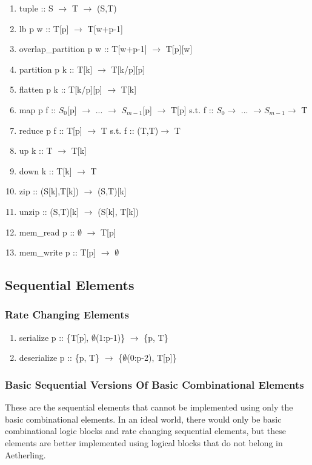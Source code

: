 \documentclass[11pt,fleqn]{article}
\numberwithin{equation}{subsection}
\begin{document}
\begin{enumerate}
    \item tuple :: S $\rightarrow$ T $\rightarrow$ (S,T)
    \item lb p w :: T[p] $\rightarrow$ T[w+p-1]
    \item overlap\_partition p w :: T[w+p-1] $\rightarrow$ T[p][w]
    \item partition p k :: T[k] $\rightarrow$ T[k/p][p]
    \item flatten p k :: T[k/p][p] $\rightarrow$ T[k]
    \item map p f :: $S_0$[p] $\rightarrow$ ... $\rightarrow$ $S_{m-1}$[p] $\rightarrow$ 
        T[p]
        \subitem s.t. f :: $S_0 \rightarrow$ ... $\rightarrow S_{m-1} \rightarrow$ T 
    \item reduce p f :: T[p] $\rightarrow$ T
        \subitem s.t. f :: (T,T)$\rightarrow$ T
    \item up k :: T $\rightarrow$ T[k]
    \item down k :: T[k] $\rightarrow$ T
    \item zip :: (S[k],T[k]) $\rightarrow$ (S,T)[k]
    \item unzip :: (S,T)[k] $\rightarrow$ (S[k], T[k])
    \item mem\_read p :: $\emptyset$ $\rightarrow$ T[p]
    \item mem\_write p :: T[p] $\rightarrow$ $\emptyset$
\end{enumerate}

\subsection{Sequential Elements}

\subsubsection{Rate Changing Elements}

\begin{enumerate}
    \item serialize p :: \{T[p], $\emptyset$(1:p-1)\} $\rightarrow$ \{p, T\}
    \item deserialize p :: \{p, T\} $\rightarrow$ \{$\emptyset$(0:p-2), T[p]\}
\end{enumerate}

\subsubsection{Basic Sequential Versions Of Basic Combinational Elements}
These are the sequential elements that cannot be implemented using only the basic
combinational elements. In an ideal world, there would only be basic
combinational logic blocks and rate changing sequential elements, but these
elements are better implemented using logical blocks that do not belong in
Aetherling.
\end{document}
